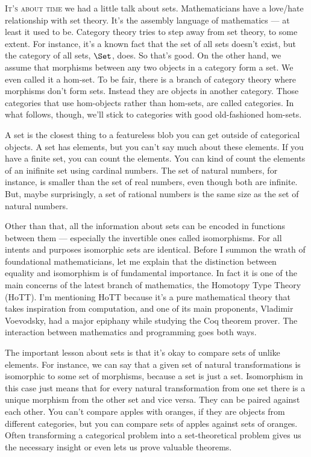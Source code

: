 \lettrine[lhang=0.17]{I}{t's about time} we had a little talk about sets. Mathematicians have a
love/hate relationship with set theory. It's the assembly language of
mathematics --- at least it used to be. Category theory tries to step
away from set theory, to some extent. For instance, it's a known fact
that the set of all sets doesn't exist, but the category of all sets,
$\Set$, does. So that's good. On the other hand, we assume that
morphisms between any two objects in a category form a set. We even
called it a hom-set. To be fair, there is a branch of category theory
where morphisms don't form sets. Instead they are objects in another
category. Those categories that use hom-objects rather than hom-sets,
are called  categories. In what follows, though, we'll
stick to categories with good old-fashioned hom-sets.

A set is the closest thing to a featureless blob you can get outside of
categorical objects. A set has elements, but you can't say much about
these elements. If you have a finite set, you can count the elements.
You can kind of count the elements of an inifinite set using cardinal
numbers. The set of natural numbers, for instance, is smaller than the
set of real numbers, even though both are infinite. But, maybe
surprisingly, a set of rational numbers is the same size as the set of
natural numbers.

Other than that, all the information about sets can be encoded in
functions between them --- especially the invertible ones called
isomorphisms. For all intents and purposes isomorphic sets are
identical. Before I summon the wrath of foundational mathematicians, let
me explain that the distinction between equality and isomorphism is of
fundamental importance. In fact it is one of the main concerns of the
latest branch of mathematics, the Homotopy Type Theory (HoTT). I'm
mentioning HoTT because it's a pure mathematical theory that takes
inspiration from computation, and one of its main proponents, Vladimir
Voevodsky, had a major epiphany while studying the Coq theorem prover.
The interaction between mathematics and programming goes both ways.

The important lesson about sets is that it's okay to compare sets of
unlike elements. For instance, we can say that a given set of natural
transformations is isomorphic to some set of morphisms, because a set is
just a set. Isomorphism in this case just means that for every natural
transformation from one set there is a unique morphism from the other
set and vice versa. They can be paired against each other. You can't
compare apples with oranges, if they are objects from different
categories, but you can compare sets of apples against sets of oranges.
Often transforming a categorical problem into a set-theoretical problem
gives us the necessary insight or even lets us prove valuable theorems.

